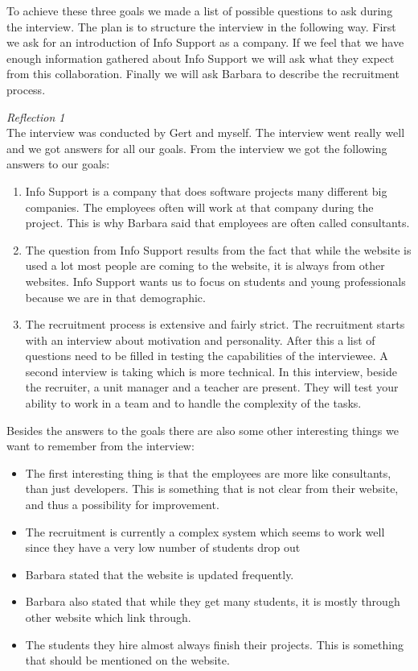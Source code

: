 \documentclass[]{article}
\begin{document}
To achieve these three goals we made a list of possible questions to ask during 
the interview. The plan is to structure the interview in the following way. 
First we ask for an introduction of Info Support as a company. If we feel 
that we have enough information gathered about Info Support we will ask what 
they expect from this collaboration. Finally we will ask Barbara to describe the 
recruitment process. 


\noindent\textit{Reflection 1}\\
The interview was conducted by Gert and myself. The interview went really well
and we got answers for all our goals. From the interview we got the 
following answers to our goals:

\begin{enumerate}
    \item Info Support is a company that does software projects many
    different big companies. The employees often will work at that company during 
    the project. This is why Barbara said that employees are often called consultants.
    \item The question from Info Support results from the fact that while the 
    website is used a lot most people are coming to the website, it is always from 
    other websites. Info Support wants us to focus on students and young 
    professionals because we are in that demographic.  
    \item The recruitment process is extensive and fairly strict. The recruitment
    starts with an interview about motivation and personality. After this a 
    list of questions need to be filled in testing the capabilities of the 
    interviewee. A second interview is taking which is more technical. In this 
    interview, beside the recruiter, a unit manager and a teacher are present. 
    They will test your ability to work in a team and to handle the complexity 
    of the tasks.
\end{enumerate}

Besides the answers to the goals there are also some other interesting things 
we want to remember from the interview:
\begin{itemize}
    \item The first interesting thing is that the employees are more like consultants,
    than just developers. This is something that is not clear from their website,
    and thus a possibility for improvement.
    \item The recruitment is currently a complex system which seems to work well
    since they have a very low number of students drop out
    \item Barbara stated that the website is updated frequently.
    \item Barbara also stated that while they get many students, it is mostly 
    through other website which link through.
    \item The students they hire almost always finish their projects. This is 
    something that should be mentioned on the website.
\end{itemize}
\end{document}
